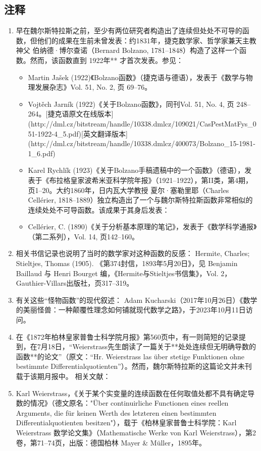 \subsection{注释}
\begin{enumerate}
\item 早在魏尔斯特拉斯之前，至少有两位研究者构造出了连续但处处不可导的函数，但他们的成果在生前未曾发表：约1831年，捷克数学家、哲学家兼天主教神父 伯纳德·博尔查诺（Bernard Bolzano, 1781–1848）构造了这样一个函数。然而，该函数直到 1922年** 才首次发表。参见：
  \begin{itemize}
  \item Martin Jašek (1922)《Bolzano函数》（捷克语与德语），发表于《数学与物理发展杂志》Vol. 51, No. 2, 页 69–76。
  \item Vojtěch Jarník (1922)《关于Bolzano函数》，同刊Vol. 51, No. 4, 页 248–264。[捷克语原文在线版本](http://dml.cz/bitstream/handle/10338.dmlcz/109021/CasPestMatFys_051-1922-4_5.pdf)[英文翻译版本](http://dml.cz/bitstream/handle/10338.dmlcz/400073/Bolzano_15-1981-1_6.pdf)
  \item Karel Rychlík (1923)《关于Bolzano手稿遗稿中的一个函数》（德语），发表于《布拉格皇家波希米亚科学院年报》（1921–1922），第II类，第4期，页1–20。大约1860年，日内瓦大学教授 夏尔·塞勒里耶（Charles Cellérier, 1818–1889）独立构造出了一个与魏尔斯特拉斯函数非常相似的连续处处不可导函数。该成果于其身后发表：
  \item Cellérier, C. (1890)《关于分析基本原理的笔记》，发表于《数学科学通报》（第二系列），Vol. 14, 页142–160。
  \end{itemize}
\item 相关书信记录也说明了当时的数学家对这种函数的反感：
Hermite, Charles; Stieltjes, Thomas (1905). 《第374封信，1893年5月20日》，见 Benjamin Baillaud 与 Henri Bourget 编，《Hermite与Stieltjes书信集》，Vol. 2，Gauthier-Villars出版社，页317–319。
\item 有关这些“怪物函数”的现代叙述：
Adam Kucharski（2017年10月26日）《数学的美丽怪兽：一种颠覆性理念如何铺就现代数学之路》，于2023年10月11日访问。

\item 在《1872年柏林皇家普鲁士科学院月报》第560页中，有一则简短的记录提到，在7月18日，“Weierstrass先生朗读了一篇关于**处处连续但无明确导数的函数**的论文”（原文：“Hr. Weierstrass las über stetige Funktionen ohne bestimmte Differentialquotienten”）。然而，魏尔斯特拉斯的这篇论文并未刊载于该期月报中。
相关文献：

\item Karl Weierstrass，《关于某个实变量的连续函数在任何取值处都不具有确定导数的情况》（德文原名："Über continuirliche Functionen eines reellen Arguments, die für keinen Werth des letzteren einen bestimmten Differentialquotienten besitzen"），载于《柏林皇家普鲁士科学院：Karl Weierstrass 数学论文集》（Mathematische Werke von Karl Weierstrass），第2卷，第71–74页，出版：德国柏林 Mayer & Müller，1895年。


\end{enumerate}
